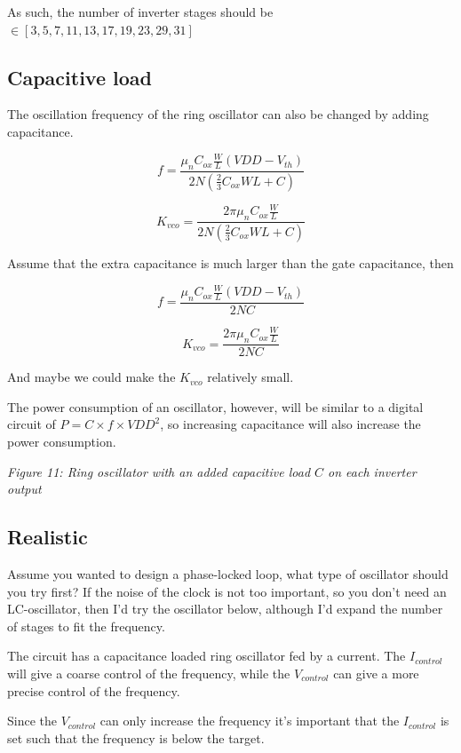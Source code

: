As such, the number of inverter stages should be
\(\in [3, 5, 7, 11, 13, 17, 19, 23, 29, 31]\)

\subsection{Capacitive load}\label{capacitive-load}

The oscillation frequency of the ring oscillator can also be changed by
adding capacitance.

\[ f = \frac{\mu_n C_{ox} \frac{W}{L} (VDD - V_{th})}{2N\left(\frac{2}{3}C_{ox}WL + C\right)}\]

\[ K_{vco} = \frac{2 \pi \mu_n C_{ox} \frac{W}{L}}{2N\left(\frac{2}{3}C_{ox}WL + C\right)}\]

Assume that the extra capacitance is much larger than the gate
capacitance, then

\[ f = \frac{\mu_n C_{ox} \frac{W}{L} (VDD - V_{th})}{2N C }\]

\[ K_{vco} = \frac{2 \pi \mu_n C_{ox} \frac{W}{L}}{2N C }\]

And maybe we could make the \(K_{vco}\) relatively small.

The power consumption of an oscillator, however, will be similar to a
digital circuit of \(P = C \times f \times VDD^2\), so increasing
capacitance will also increase the power consumption.


{
\centering
{}
}

\emph{Figure 11: Ring oscillator with an added capacitive load \(C\) on
each inverter output}

\subsection{Realistic}\label{realistic}

Assume you wanted to design a phase-locked loop, what type of oscillator
should you try first? If the noise of the clock is not too important, so
you don't need an LC-oscillator, then I'd try the oscillator below,
although I'd expand the number of stages to fit the frequency.

The circuit has a capacitance loaded ring oscillator fed by a current.
The \(I_{control}\) will give a coarse control of the frequency, while
the \(V_{control}\) can give a more precise control of the frequency.

Since the \(V_{control}\) can only increase the frequency it's important
that the \(I_{control}\) is set such that the frequency is below the
target.

